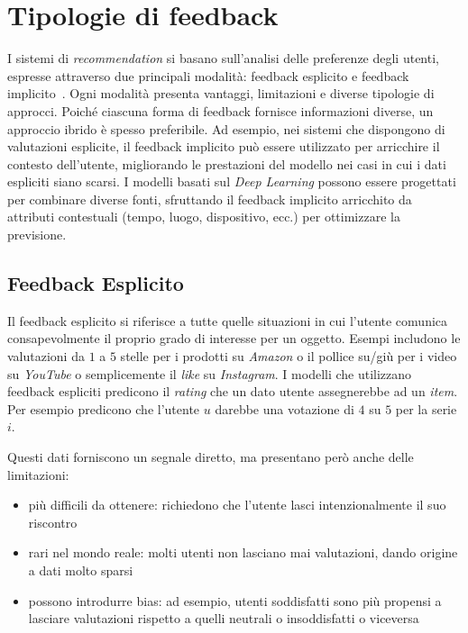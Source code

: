 \section{Tipologie di feedback}

I sistemi di \textit{recommendation} si basano sull'analisi delle preferenze degli utenti, espresse attraverso due principali modalità: feedback esplicito e feedback implicito~\cite{ALS}. Ogni modalità presenta vantaggi, limitazioni e diverse tipologie di approcci. Poiché ciascuna forma di feedback fornisce informazioni diverse, un approccio ibrido è spesso preferibile. Ad esempio, nei sistemi che dispongono di valutazioni esplicite, il feedback implicito può essere utilizzato per arricchire il contesto dell'utente, migliorando le prestazioni del modello nei casi in cui i dati espliciti siano scarsi. I modelli basati sul \textit{Deep Learning} possono essere progettati per combinare diverse fonti, sfruttando il feedback implicito arricchito da attributi contestuali (tempo, luogo, dispositivo, ecc.) per ottimizzare la previsione.

\subsection{Feedback Esplicito}

Il feedback esplicito si riferisce a tutte quelle situazioni in cui l'utente comunica consapevolmente il proprio grado di interesse per un oggetto. Esempi includono le valutazioni da $1$ a $5$ stelle per i prodotti su \textit{Amazon} o il pollice su/giù per i video su \textit{YouTube} o semplicemente il \textit{like} su \textit{Instagram}. I modelli che utilizzano feedback espliciti predicono il \textit{rating} che un dato utente assegnerebbe ad un \textit{item}. Per esempio predicono che l'utente $u$ darebbe una votazione di $4$ su $5$ per la serie $i$.

Questi dati forniscono un segnale diretto, ma presentano però anche delle limitazioni:

\begin{itemize}
    \item più difficili da ottenere: richiedono che l'utente lasci intenzionalmente il suo riscontro
    \item rari nel mondo reale: molti utenti non lasciano mai valutazioni, dando origine a dati molto sparsi
    \item possono introdurre bias: ad esempio, utenti soddisfatti sono più propensi a lasciare valutazioni rispetto a quelli neutrali o insoddisfatti o viceversa
\end{itemize}

